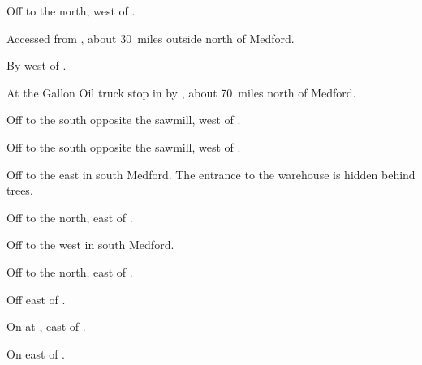

\begin{LocationList}

Off  to the north, west of .

Accessed from , about 30~miles outside  north of Medford.

By  west of .

At the Gallon Oil truck stop in  by , about 70~miles north of Medford.

\Location{\GarageHQ \Garage}
Off  to the south opposite the sawmill, west of .

Off  to the south opposite the sawmill, west of .

Off  to the east in south Medford.
The entrance to the warehouse is hidden behind trees.

Off  to the north, east of .

Off  to the west in south Medford.

Off  to the north, east of .

\Location{\TruckStop \Gas \Rest \Service}
Off  east of .

On  at , east of .

On  east of .

\end{LocationList}
